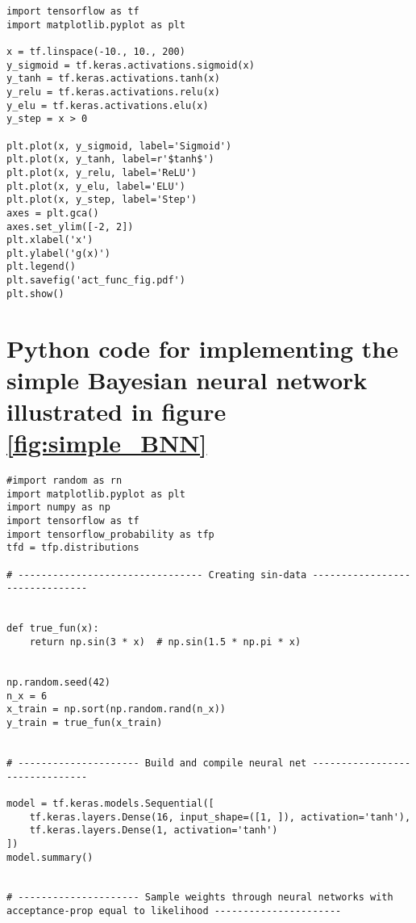 \begin{appendices}
\begin{lstlisting}
import tensorflow as tf
import matplotlib.pyplot as plt

x = tf.linspace(-10., 10., 200)
y_sigmoid = tf.keras.activations.sigmoid(x)
y_tanh = tf.keras.activations.tanh(x)
y_relu = tf.keras.activations.relu(x)
y_elu = tf.keras.activations.elu(x)
y_step = x > 0

plt.plot(x, y_sigmoid, label='Sigmoid')
plt.plot(x, y_tanh, label=r'$tanh$')
plt.plot(x, y_relu, label='ReLU')
plt.plot(x, y_elu, label='ELU')
plt.plot(x, y_step, label='Step')
axes = plt.gca()
axes.set_ylim([-2, 2])
plt.xlabel('x')
plt.ylabel('g(x)')
plt.legend()
plt.savefig('act_func_fig.pdf')
plt.show()
\end{lstlisting}


\section{Python code for implementing the simple Bayesian neural network illustrated in figure \ref{fig:simple_BNN}} \label{app:simple_BNN}
\begin{lstlisting}
#import random as rn
import matplotlib.pyplot as plt
import numpy as np
import tensorflow as tf
import tensorflow_probability as tfp
tfd = tfp.distributions

# -------------------------------- Creating sin-data -------------------------------


def true_fun(x):
    return np.sin(3 * x)  # np.sin(1.5 * np.pi * x)


np.random.seed(42)
n_x = 6
x_train = np.sort(np.random.rand(n_x))
y_train = true_fun(x_train)  


# --------------------- Build and compile neural net -------------------------------

model = tf.keras.models.Sequential([
    tf.keras.layers.Dense(16, input_shape=([1, ]), activation='tanh'),
    tf.keras.layers.Dense(1, activation='tanh')
])
model.summary()


# --------------------- Sample weights through neural networks with acceptance-prop equal to likelihood ----------------------


\end{lstlisting}
\end{appendices}
